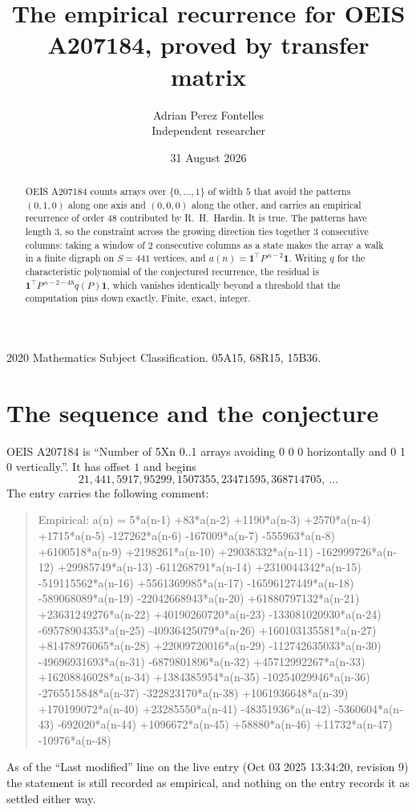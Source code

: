 \documentclass[11pt,a4paper]{article}
\title{The empirical recurrence for OEIS A207184, proved by transfer matrix}
\author{Adrian Perez Fontelles\\ \small Independent researcher}
\date{31 August 2026}
\theoremstyle{plain}
\theoremstyle{definition}
\begin{document}
\maketitle

\begin{abstract}
OEIS A207184 counts arrays over $\{0,\dots,1\}$ of width $5$ that avoid the patterns
$(0,1,0)$ along one axis and $(0,0,0)$ along the other, and carries an empirical recurrence of
order $48$ contributed by R.~H.~Hardin. It is true. The patterns have length $3$, so
the constraint across the growing direction ties together $3$ consecutive columns: taking a
window of $2$ consecutive columns as a state makes the array a walk in a finite digraph
on $S=441$ vertices, and $a(n)=\mathbf{1}^{\!\top}P^{\,n-2}\mathbf{1}$. Writing $q$
for the characteristic polynomial of the conjectured recurrence, the residual is
$\mathbf{1}^{\!\top}P^{\,n-2-48}q(P)\mathbf{1}$, which vanishes identically
beyond a threshold that the computation pins down exactly. Finite, exact, integer.
\end{abstract}

\noindent\small 2020 Mathematics Subject Classification. 05A15, 68R15, 15B36.\normalsize

\section{The sequence and the conjecture}

OEIS A207184 is ``Number of 5Xn 0..1 arrays avoiding 0 0 0 horizontally and 0 1 0 vertically.''. It has offset
$1$ and begins
\[
21, 441, 5917, 95299, 1507355, 23471595, 368714705,\ \dots
\]
The entry carries the following comment:
\begin{quote}\small
Empirical: a(n) = 5*a(n-1) +83*a(n-2) +1190*a(n-3) +2570*a(n-4) +1715*a(n-5) -127262*a(n-6) -167009*a(n-7) -555963*a(n-8) +6100518*a(n-9) +2198261*a(n-10) +29038332*a(n-11) -162999726*a(n-12) +29985749*a(n-13) -611268791*a(n-14) +2310044342*a(n-15) -519115562*a(n-16) +5561369985*a(n-17) -16596127449*a(n-18) -589068089*a(n-19) -22042668943*a(n-20) +61880797132*a(n-21) +23631249276*a(n-22) +40190260720*a(n-23) -133081020930*a(n-24) -69578904353*a(n-25) -40936425079*a(n-26) +160103135581*a(n-27) +81478976065*a(n-28) +22009720016*a(n-29) -112742635033*a(n-30) -49696931693*a(n-31) -6879801896*a(n-32) +45712992267*a(n-33) +16208846028*a(n-34) +1384385954*a(n-35) -10254029946*a(n-36) -2765515848*a(n-37) -322823170*a(n-38) +1061936648*a(n-39) +170199072*a(n-40) +23285550*a(n-41) -48351936*a(n-42) -5360604*a(n-43) -692020*a(n-44) +1096672*a(n-45) +58880*a(n-46) +11732*a(n-47) -10976*a(n-48)
\end{quote}
As of the ``Last modified'' line on the live entry (Oct 03 2025 13:34:20, revision
9) the statement is still recorded as empirical, and nothing on the entry
records it as settled either way.
\end{document}
